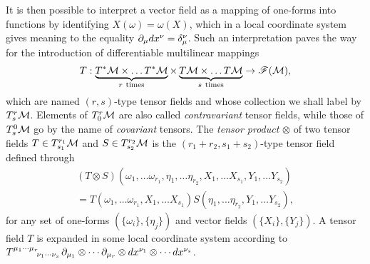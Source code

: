 \documentclass[
final,
11pt,
a4paper,
DIV=11,
headinclude=true,
footinclude=false,
bibliography=totoc,
twoside=true,  %
BCOR=5mm
]{scrbook}
\begin{document}
It is then possible to interpret a vector field as a mapping of 
one-forms into functions by identifying $X(\omega) = \omega(X)$, 
which in a local coordinate system gives meaning to the equality 
$\partial_\mu dx^\nu = \delta^\nu_\mu$. Such an interpretation paves 
the way for the introduction of differentiable multilinear 
mappings
\begin{equation*}
  T : \underbrace{T^*\mathcal{M} \times \dots 
    T^*\mathcal{M}}_{r~\text{times}} \times \underbrace{T\mathcal{M} \times 
    \dots T\mathcal{M}}_{s~\text{times}} \to \mathscr{F}(\mathcal{M}),
\end{equation*}
which are named $(r,s)$-type tensor fields and whose collection 
we shall label by $T^r_s\mathcal{M}$. Elements of $T^r_0\mathcal{M}$ are 
also called \emph{contravariant} tensor fields, while those of 
$T^0_s\mathcal{M}$ go by the name of \emph{covariant} tensors. The 
\emph{tensor product} $\otimes$ of two tensor fields $T \in 
T^{r_1}_{s_1}\mathcal{M}$ and $S \in T^{r_2}_{s_2}\mathcal{M}$ is the 
$(r_1+r_2, s_1+s_2)$-type tensor field defined through
\begin{multline*}
  (T \otimes S)(\omega_1, \ldots \omega_{r_1}, \eta_1, \ldots 
  \eta_{r_2}, X_1, \dots X_{s_1}, Y_1, \dots Y_{s_2}) \\
  = T(\omega_1, \ldots \omega_{r_1}, X_1, \dots X_{s_1})
    S(\eta_1, \ldots \eta_{r_2}, Y_1, \dots Y_{s_2}),
\end{multline*}
for any set of one-forms $(\{\omega_i\},\{\eta_j\})$ and vector 
fields $(\{X_i\},\{Y_j\})$. A tensor field $T$ is expanded in 
some local coordinate system according to 
$T\ind{^{\mu_1\cdots\mu_r}_{\nu_1\cdots\nu_s}} \pd_{\mu_1} 
\otimes \cdots \pd_{\mu_r} \otimes dx^{\nu_1} \otimes \cdots 
dx^{\nu_s}$.
\end{document}
